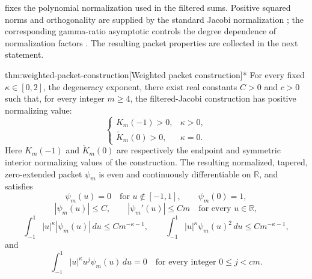 \documentclass[11pt]{article}
\begin{document}
 fixes the polynomial normalization used in the filtered sums. Positive squared norms and orthogonality are supplied by the standard Jacobi normalization \citep[Table 18.3.1, Jacobi row and caption]{https://dlmf.nist.gov/18.3}; the corresponding gamma-ratio asymptotic controls the degree dependence of normalization factors \citep[equation (5.11.12), positive real axis]{https://dlmf.nist.gov/5.11.E12}. The resulting packet properties are collected in the next statement.

\begin{theoremv}{thm:weighted-packet-construction}[Weighted packet construction]*
For every fixed \(\kappa\in[0,2]\), the degeneracy exponent, there exist real constants \(C>0\) and \(c>0\) such that, for every integer \(m\ge4\), the filtered-Jacobi construction has positive normalizing value:
\[
\begin{cases}
K_m(-1)>0, & \kappa>0,\\
\widetilde K_m(0)>0, & \kappa=0.
\end{cases}
\]
Here \(K_m(-1)\) and \(\widetilde K_m(0)\) are respectively the endpoint and symmetric interior normalizing values of the construction. The resulting normalized, tapered, zero-extended packet \(\psi_m\) is even and continuously differentiable on \(\mathbb R\), and satisfies
\[
\psi_m(u)=0\quad\text{for }u\notin[-1,1],
\qquad
\psi_m(0)=1,
\]
\[
|\psi_m(u)|\le C,\qquad
|\psi_m'(u)|\le Cm
\quad\text{for every }u\in\mathbb R,
\]
\[
\int_{-1}^{1}|u|^\kappa|\psi_m(u)|\,du
\le Cm^{-\kappa-1},
\qquad
\int_{-1}^{1}|u|^\kappa\psi_m(u)^2\,du
\le Cm^{-\kappa-1},
\]
and
\[
\int_{-1}^{1}|u|^\kappa u^j\psi_m(u)\,du=0
\quad\text{for every integer }0\le j<cm.
\]
\end{theoremv}
\end{document}
